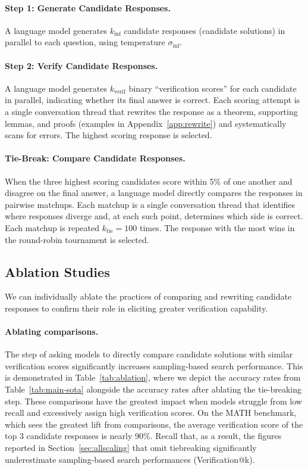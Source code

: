 \paragraph{Step 1: Generate Candidate Responses.}
A language model generates $k_{\mathrm{inf}}$ candidate responses (candidate solutions) in parallel to each question, using temperature $\sigma_{\mathrm{inf}}$.

\paragraph{Step 2: Verify Candidate Responses.}
A language model generates $k_{\mathrm{verif}}$ binary ``verification scores'' for each candidate in parallel, indicating whether its final answer is correct.
Each scoring attempt is a single conversation thread that rewrites the response as a theorem, supporting lemmas, and proofs (examples in Appendix~\ref{app:rewrite}) and systematically scans for errors.
The highest scoring response is selected.

\paragraph{Tie-Break: Compare Candidate Responses.}
When the three highest scoring candidates score within 5\% of one another and disagree on the final answer, a language model directly compares the responses in pairwise matchups.
Each matchup is a single conversation thread that identifies where responses diverge and, at each such point, determines which side is correct.
Each matchup is repeated \(k_{\mathrm{tie}} = 100\) times.
The response with the most wins in the round-robin tournament is selected.

\subsection{Ablation Studies}
We can individually ablate the practices of comparing and rewriting candidate responses to confirm their role in eliciting greater verification capability.

\paragraph{Ablating comparisons.}
The step of asking models to directly compare candidate solutions with similar verification scores significantly increases sampling-based search performance.
This is demonstrated in Table~\ref{tab:ablation}, where we depict the accuracy rates from Table~\ref{tab:main-sota} alongside the accuracy rates after ablating the tie-breaking step.
These comparisons have the greatest impact when models struggle from low recall and excessively assign high verification scores.
On the MATH benchmark, which sees the greatest lift from comparisons, the average verification score of the top 3 candidate responses is nearly 90\%.
Recall that, as a result, the figures reported in Section~\ref{sec:allscaling} that omit tiebreaking significantly underestimate sampling-based search performances (Verification@k).


